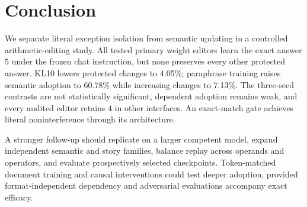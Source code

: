 \section{Conclusion}
\label{sec:conclusion}
We separate literal exception isolation from semantic updating in a controlled arithmetic-editing study. All tested primary weight editors learn the exact answer $5$ under the frozen chat instruction, but none preserves every other protected answer. KL10 lowers protected changes to 4.05\%; paraphrase training raises semantic adoption to 60.78\% while increasing changes to 7.13\%. The three-seed contrasts are not statistically significant, dependent adoption remains weak, and every audited editor retains $4$ in other interfaces. An exact-match gate achieves literal noninterference through its architecture.

A stronger follow-up should replicate on a larger competent model, expand independent semantic and story families, balance replay across operands and operators, and evaluate prospectively selected checkpoints. Token-matched document training and causal interventions could test deeper adoption, provided format-independent dependency and adversarial evaluations accompany exact efficacy.
